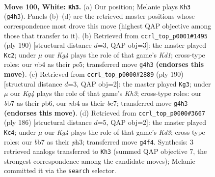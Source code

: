 \documentclass[11pt]{article}
\begin{document}
\clearpage

\begin{figure}[p]\centering
\begin{subfigure}{0.46\textwidth}\centering
\resizebox{\linewidth}{!}{%
\newchessgame
\chessboard[
  setfen={8/1b5k/8/8/1n1B2K1/8/5P2/8 w - - 45 100},
  showmover=false,
  pgfstyle=straightmove, color=movearrow, markmove={g4-h3}
]}
\caption{}
\end{subfigure}\hfill
\begin{subfigure}{0.46\textwidth}\centering
\resizebox{\linewidth}{!}{%
\newchessgame
\chessboard[
  setfen={8/2k5/8/3Bp3/8/4bP2/8/3K4 w - - 13 96},
  showmover=false,
  pgfstyle=straightmove, color=movearrow, markmove={d1-c2}
]}
\caption{}
\end{subfigure}
\\[4pt]
\begin{subfigure}{0.46\textwidth}\centering
\resizebox{\linewidth}{!}{%
\newchessgame
\chessboard[
  setfen={8/4b3/1p6/1P6/2B5/7K/8/6k1 w - - 5 96},
  showmover=false,
  pgfstyle=straightmove, color=movearrow, markmove={h3-g3}
]}
\caption{}
\end{subfigure}\hfill
\begin{subfigure}{0.46\textwidth}\centering
\resizebox{\linewidth}{!}{%
\newchessgame
\chessboard[
  setfen={1k6/8/8/1n6/8/3K3p/7P/6B1 w - - 18 94},
  showmover=false,
  pgfstyle=straightmove, color=movearrow, markmove={d3-c4}
]}
\caption{}
\end{subfigure}
\caption{\textbf{Move 100, White: \texttt{Kh3}.} (a) Our position; Melanie plays \texttt{Kh3} (\texttt{g4h3}). Panels (b)--(d) are the retrieved master positions whose correspondence most drove this move (highest QAP objective among those that transfer to it). (b) Retrieved from \texttt{ccrl\_top\_p0001\#1495} (ply 190) [structural distance $d$=3, QAP obj=3]: the master played \texttt{Kc2}; under $\mu$ our \emph{Kg4} plays the role of that game's \emph{Kd1}; cross-type roles: our \emph{n}b4 as their \emph{p}e5; transferred move \texttt{g4h3} \textbf{(endorses this move)}. (c) Retrieved from \texttt{ccrl\_top\_p0000\#2889} (ply 190) [structural distance $d$=3, QAP obj=2]: the master played \texttt{Kg3}; under $\mu$ our \emph{Kg4} plays the role of that game's \emph{Kh3}; cross-type roles: our \emph{b}b7 as their \emph{p}b6, our \emph{n}b4 as their \emph{b}e7; transferred move \texttt{g4h3} \textbf{(endorses this move)}. (d) Retrieved from \texttt{ccrl\_top\_p0000\#3667} (ply 186) [structural distance $d$=5, QAP obj=2]: the master played \texttt{Kc4}; under $\mu$ our \emph{Kg4} plays the role of that game's \emph{Kd3}; cross-type roles: our \emph{b}b7 as their \emph{p}h3; transferred move \texttt{g4f4}. Synthesis: 3 retrieved analogs transferred to \texttt{Kh3} (summed QAP objective 7, the strongest correspondence among the candidate moves); Melanie committed it via the \texttt{search} selector.}
\label{fig:thought-m198}
\end{figure}
\end{document}
